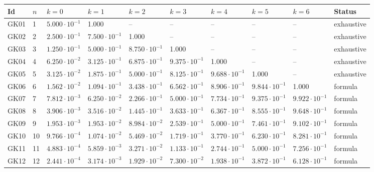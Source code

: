 {\scriptsize\setlength{\tabcolsep}{3pt}
\begin{longtable}{@{}llllllllll@{}}
\toprule
Id & $n$ & $k=0$ & $k=1$ & $k=2$ & $k=3$ & $k=4$ & $k=5$ & $k=6$ & Status \\
\midrule\endhead
\bottomrule\endfoot
GK01 & 1 & $5.000\cdot 10^{-1}$ & 1.000 & -- & -- & -- & -- & -- & exhaustive \\
GK02 & 2 & $2.500\cdot 10^{-1}$ & $7.500\cdot 10^{-1}$ & 1.000 & -- & -- & -- & -- & exhaustive \\
GK03 & 3 & $1.250\cdot 10^{-1}$ & $5.000\cdot 10^{-1}$ & $8.750\cdot 10^{-1}$ & 1.000 & -- & -- & -- & exhaustive \\
GK04 & 4 & $6.250\cdot 10^{-2}$ & $3.125\cdot 10^{-1}$ & $6.875\cdot 10^{-1}$ & $9.375\cdot 10^{-1}$ & 1.000 & -- & -- & exhaustive \\
GK05 & 5 & $3.125\cdot 10^{-2}$ & $1.875\cdot 10^{-1}$ & $5.000\cdot 10^{-1}$ & $8.125\cdot 10^{-1}$ & $9.688\cdot 10^{-1}$ & 1.000 & -- & exhaustive \\
GK06 & 6 & $1.562\cdot 10^{-2}$ & $1.094\cdot 10^{-1}$ & $3.438\cdot 10^{-1}$ & $6.562\cdot 10^{-1}$ & $8.906\cdot 10^{-1}$ & $9.844\cdot 10^{-1}$ & 1.000 & formula \\
GK07 & 7 & $7.812\cdot 10^{-3}$ & $6.250\cdot 10^{-2}$ & $2.266\cdot 10^{-1}$ & $5.000\cdot 10^{-1}$ & $7.734\cdot 10^{-1}$ & $9.375\cdot 10^{-1}$ & $9.922\cdot 10^{-1}$ & formula \\
GK08 & 8 & $3.906\cdot 10^{-3}$ & $3.516\cdot 10^{-2}$ & $1.445\cdot 10^{-1}$ & $3.633\cdot 10^{-1}$ & $6.367\cdot 10^{-1}$ & $8.555\cdot 10^{-1}$ & $9.648\cdot 10^{-1}$ & formula \\
GK09 & 9 & $1.953\cdot 10^{-3}$ & $1.953\cdot 10^{-2}$ & $8.984\cdot 10^{-2}$ & $2.539\cdot 10^{-1}$ & $5.000\cdot 10^{-1}$ & $7.461\cdot 10^{-1}$ & $9.102\cdot 10^{-1}$ & formula \\
GK10 & 10 & $9.766\cdot 10^{-4}$ & $1.074\cdot 10^{-2}$ & $5.469\cdot 10^{-2}$ & $1.719\cdot 10^{-1}$ & $3.770\cdot 10^{-1}$ & $6.230\cdot 10^{-1}$ & $8.281\cdot 10^{-1}$ & formula \\
GK11 & 11 & $4.883\cdot 10^{-4}$ & $5.859\cdot 10^{-3}$ & $3.271\cdot 10^{-2}$ & $1.133\cdot 10^{-1}$ & $2.744\cdot 10^{-1}$ & $5.000\cdot 10^{-1}$ & $7.256\cdot 10^{-1}$ & formula \\
GK12 & 12 & $2.441\cdot 10^{-4}$ & $3.174\cdot 10^{-3}$ & $1.929\cdot 10^{-2}$ & $7.300\cdot 10^{-2}$ & $1.938\cdot 10^{-1}$ & $3.872\cdot 10^{-1}$ & $6.128\cdot 10^{-1}$ & formula \\

\end{longtable}}
